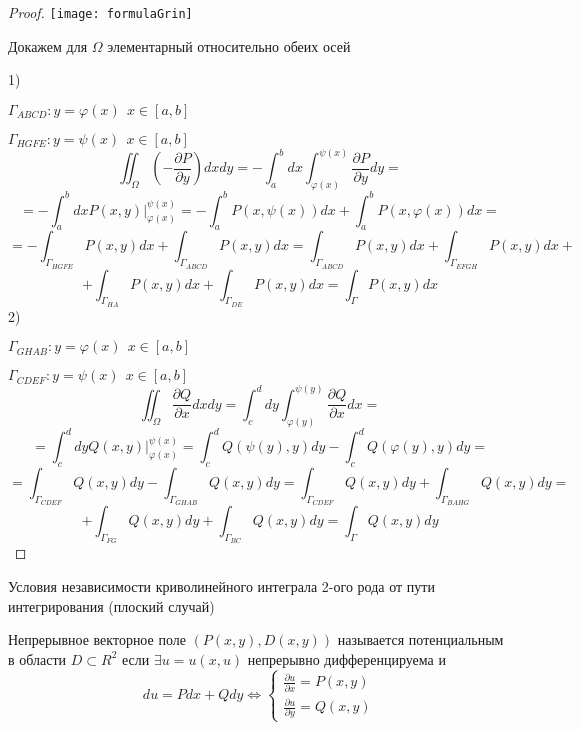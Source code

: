 \begin{proof}
  \texttt{[image: formulaGrin]}

  Докажем для $\Omega$ элементарный относительно обеих осей

  1)

  $\Gamma_{ABCD}: y = \varphi(x) ~~ x \in [a,b]$

  $\Gamma_{HGFE}: y = \psi(x) ~~ x \in [a,b]$
  $$
  \iint_{\Omega} \left( -\frac{\partial P}{\partial y} \right) dx dy =
  -\int_a^b dx \int_{\varphi(x)}^{\psi(x)} \frac{\partial P}{\partial y} dy =
  $$
  $$
  = -\int_a^b dx P(x,y) |_{\varphi(x)}^{\psi(x)} =
  - \int_a^b P(x, \psi(x))dx + \int_a^b P(x, \varphi(x)) dx =
  $$
  $$
  = -\int_{\Gamma_{HGFE}} P(x, y) dx + \int_{\Gamma_{ABCD}} P(x,y)dx =
  \int_{\Gamma_{ABCD}} P(x,y)dx + \int_{\Gamma_{EFGH}} P(x,y)dx +
  $$
  $$
  + \int_{\Gamma_{HA}} P(x, y)dx + \int_{\Gamma_{DE}} P(x,y) dx =
  \int_{\Gamma} P(x,y) dx
  $$
  2)

  $\Gamma_{GHAB}: y = \varphi(x) ~~ x \in [a,b]$

  $\Gamma_{CDEF}: y = \psi(x) ~~ x \in [a,b]$
  $$
  \iint_{\Omega} \frac{\partial Q}{\partial x} dx dy =
  \int_c^d dy \int_{\varphi(y)}^{\psi(y)} \frac{\partial Q}{\partial x} dx =
  $$
  $$
  = \int_c^d dy Q(x,y) |_{\varphi(x)}^{\psi(x)} =
  \int_c^d Q(\psi(y), y)dy - \int_c^d Q(\varphi(y), y) dy =
  $$
  $$
  = \int_{\Gamma_{CDEF}} Q(x, y) dy - \int_{\Gamma_{GHAB}} Q(x,y)dy =
  \int_{\Gamma_{CDEF}} Q(x, y) dy + \int_{\Gamma_{BAHG}} Q(x,y)dy =
  $$
  $$
  + \int_{\Gamma_{FG}} Q(x, y)dy + \int_{\Gamma_{BC}} Q(x,y) dy =
  \int_{\Gamma} Q(x,y) dy
  $$
\end{proof}

\begin{title}[\Large]
  Условия независимости криволинейного интеграла 2-ого рода от пути
  интегрирования (плоский случай)
\end{title}

\begin{define}
  Непрерывное векторное поле $(P(x,y), D(x,y))$ называется потенциальным в
  области $D \subset R^2$ если $\exists u = u(x,u)$ непрерывно дифференцируема
  и
  $$
  du = Pdx + Qdy \Leftrightarrow
  \left\{
  \begin{array}{c}
    \frac{\partial u}{\partial x} = P(x, y) \\

    \frac{\partial u}{\partial y} = Q(x, y)
  \end{array}
  \right.
  $$
\end{define}

